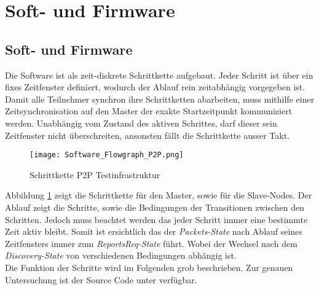 \newpage
\section{Soft- und Firmware}\label{sec:P2PSoft-undFirmware}

\subsection{Soft- und Firmware}\label{sec:SoftundFirmware}

Die Software ist als zeit-diskrete Schrittkette aufgebaut. Jeder Schritt ist über ein fixes Zeitfenster definiert, wodurch der Ablauf rein zeitabhängig vorgegeben ist. Damit alle Teilnehmer synchron ihre Schrittketten abarbeiten, muss mithilfe einer Zeitsynchronisation auf den Master der exakte Startzeitpunkt kommuniziert werden. Unabhängig vom Zustand des aktiven Schrittes, darf dieser sein Zeitfenster nicht überschreiten, ansonsten fällt die Schrittkette ausser Takt. 

\begin{figure} [H]
	\centering
	\texttt{[image: Software\_Flowgraph\_P2P.png]}
	\caption{Schrittkette P2P Testinfrastruktur}
	\label{fig:FlowgraphP2P}
\end{figure}

Abbildung \ref{fig:FlowgraphP2P} zeigt die Schrittkette für den Master, sowie für die Slave-Nodes. Der Ablauf zeigt die Schritte, sowie die Bedingungen der Transitionen zwischen den Schritten. Jedoch muss beachtet werden das jeder Schritt immer eine bestimmte Zeit aktiv bleibt. Somit ist ersichtlich das der \textit{Packets-State} nach Ablauf seines Zeitfensters immer zum \textit{ReportsReq-State} führt. Wobei der Wechsel nach dem \textit{Discovery-State} von verschiedenen Bedingungen abhängig ist. \\

Die Funktion der Schritte wird im Folgenden grob beschrieben. Zur genauen Untersuchung ist der Source Code unter \cite{github_p6_software_p2p_2020} verfügbar.  \\

